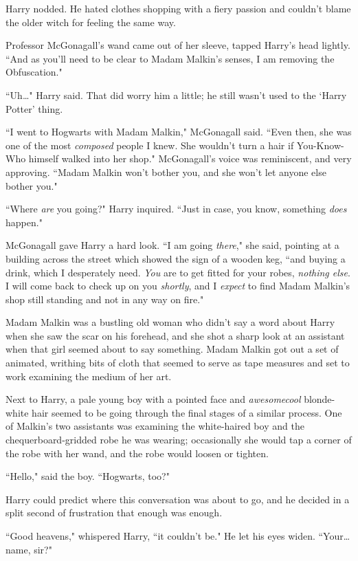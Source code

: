 Harry nodded. He hated clothes shopping with a fiery passion and couldn't blame the older witch for feeling the same way.

Professor McGonagall's wand came out of her sleeve, tapped Harry's head lightly. ``And as you'll need to be clear to Madam Malkin's senses, I am removing the Obfuscation."

``Uh{\ldots}" Harry said. That did worry him a little; he still wasn't used to the `Harry Potter' thing.

``I went to Hogwarts with Madam Malkin," McGonagall said. ``Even then, she was one of the most \emph{composed} people I knew. She wouldn't turn a hair if You-Know-Who himself walked into her shop." McGonagall's voice was reminiscent, and very approving. ``Madam Malkin won't bother you, and she won't let anyone else bother you."

``Where \emph{are} you going?" Harry inquired. ``Just in case, you know, something \emph{does} happen."

McGonagall gave Harry a hard look. ``I am going \emph{there}," she said, pointing at a building across the street which showed the sign of a wooden keg, ``and buying a drink, which I desperately need. \emph{You} are to get fitted for your robes, \emph{nothing else}. I will come back to check up on you \emph{shortly}, and I \emph{expect} to find Madam Malkin's shop still standing and not in any way on fire."

Madam Malkin was a bustling old woman who didn't say a word about Harry when she saw the scar on his forehead, and she shot a sharp look at an assistant when that girl seemed about to say something. Madam Malkin got out a set of animated, writhing bits of cloth that seemed to serve as tape measures and set to work examining the medium of her art.

Next to Harry, a pale young boy with a pointed face and \emph{awesomecool} blonde-white hair seemed to be going through the final stages of a similar process. One of Malkin's two assistants was examining the white-haired boy and the chequerboard-gridded robe he was wearing; occasionally she would tap a corner of the robe with her wand, and the robe would loosen or tighten.

``Hello," said the boy. ``Hogwarts, too?"

Harry could predict where this conversation was about to go, and he decided in a split second of frustration that enough was enough.

``Good heavens," whispered Harry, ``it couldn't be." He let his eyes widen. ``Your{\ldots} name, sir?"

